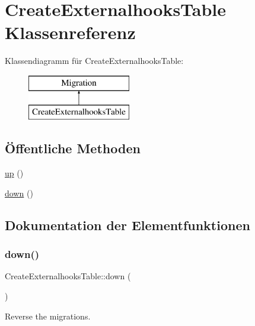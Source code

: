 \hypertarget{classCreateExternalhooksTable}{}\section{Create\+Externalhooks\+Table Klassenreferenz}
\label{classCreateExternalhooksTable}
Klassendiagramm für Create\+Externalhooks\+Table\+:\begin{figure}[H]
\begin{center}
\leavevmode
\includegraphics[height=2.000000cm]{d2/d37/classCreateExternalhooksTable}
\end{center}
\end{figure}
\subsection*{Öffentliche Methoden}
\begin{DoxyCompactItemize}
\item 
\hyperlink{classCreateExternalhooksTable_a5b5d0eca57170eb53040a6a166c8bde9}{up} ()
\item 
\hyperlink{classCreateExternalhooksTable_a0b51d212da27067a6dbd12fd01f2c9da}{down} ()
\end{DoxyCompactItemize}


\subsection{Dokumentation der Elementfunktionen}
\mbox{\label{classCreateExternalhooksTable_a0b51d212da27067a6dbd12fd01f2c9da}} 
\subsubsection{\texorpdfstring{down()}{down()}}
{\footnotesize\ttfamily Create\+Externalhooks\+Table\+::down (\begin{DoxyParamCaption}{ }\end{DoxyParamCaption})}

Reverse the migrations.

